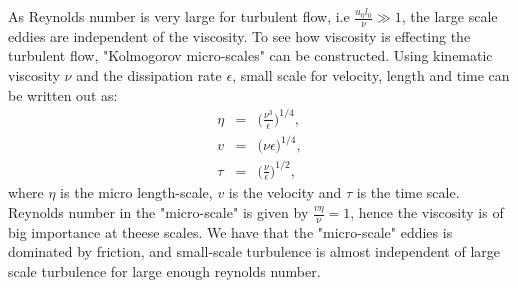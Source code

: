 \documentclass[a4paper, 12pt]{report}
\begin{document}
As Reynolds number is very large for turbulent flow, i.e $\frac{u_0l_0}{\nu} \gg 1$, the large scale eddies are independent of the viscosity. To see how viscosity is effecting the turbulent flow, "Kolmogorov micro-scales" can be constructed. Using kinematic viscosity $\nu$ and the dissipation rate $\epsilon$, small scale for velocity, length and time can be written out as:
\begin{eqnarray}
\label{eqn:microLength}
\eta &=& \big(\frac{\nu^3}{\epsilon}\big)^{1/4}, \\
\label{eqn:microVelocity}
v &=& \big(\nu\epsilon\big)^{1/4}, \\
\label{eqn:microTime}
\tau &=& \big(\frac{\nu}{\epsilon}\big)^{1/2}, 
\end{eqnarray}  
where  $\eta$ is the micro length-scale, $v$ is the velocity and $\tau$ is the time scale. Reynolds number in the "micro-scale" is given by $\frac{v\eta}{\nu} = 1$, hence the viscosity is of big importance at theese scales. We have that the "micro-scale" eddies is dominated by friction, and small-scale turbulence is almost independent of large scale turbulence for large enough reynolds number.
\end{document}
